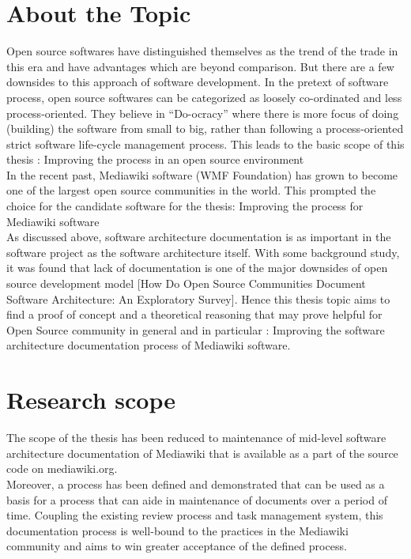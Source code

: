\section{About the Topic}\label{sec:about}
\indent Open source softwares have distinguished themselves as the trend of the trade in this era and have advantages which are beyond comparison. But there are a few downsides to this approach of software development. In the pretext of software process, open source softwares can be categorized as loosely co-ordinated and less process-oriented. They believe in \enquote{Do-ocracy} where there is more focus of doing (building) the software from small to big, rather than following a process-oriented strict software life-cycle management process. This leads to the basic scope of this thesis : Improving the process in an open source environment
\\\indent In the recent past, Mediawiki software (WMF Foundation) has grown to become one of the largest open source communities in the world. This prompted the choice for the candidate software for the thesis: Improving the process for Mediawiki software
\\\indent As discussed above, software architecture documentation is as important in the software project as the software architecture itself. With some background study, it was found that lack of documentation is one of the major downsides of open source development model [How Do Open Source Communities Document Software Architecture: An Exploratory Survey]. Hence this thesis topic aims to find a proof of concept  and a theoretical reasoning that may prove helpful for Open Source community in general and in particular  : Improving the software architecture documentation process of Mediawiki software.

\section{Research scope}\label{sec:scope}
The scope of the thesis has been reduced to maintenance of mid-level software architecture documentation of Mediawiki that is available as a part of the source code on mediawiki.org.
\\\indent Moreover, a process has been defined and demonstrated that can be used as a basis for a process that can aide in maintenance of documents over a period of time. Coupling the existing review process and task management system, this documentation process is well-bound to the practices in the Mediawiki community and aims to win greater acceptance of the defined process.

